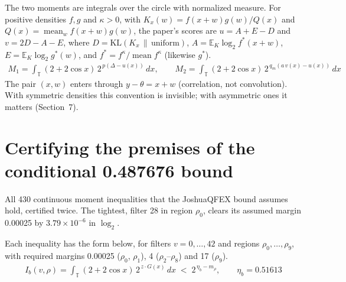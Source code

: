 \documentclass[11pt]{article}
\DeclareMathOperator{\mean}{mean}
\newcommand{\E}{\mathbb{E}}
\newcommand{\KL}{\mathrm{KL}}
\theoremstyle{plain}
\begin{document}
The two moments are integrals over the circle with normalized measure. For positive densities $f, g$ and $\kappa > 0$, with $K_x(w) = f(x+w)g(w)/Q(x)$ and $Q(x) = \mean_w f(x+w)g(w)$, the paper's scores are $u = A + E - D$ and $v = 2D - A - E$, where $D = \KL(K_x \,\|\, \mathrm{uniform})$, $A = \E_K \log_2 f^*(x+w)$, $E = \E_K \log_2 g^*(w)$, and $f^* = f^\kappa / \mean f^\kappa$ (likewise $g^*$).
\begin{gather*}
M_1 = \int_{\mathbb T} (2+2\cos x)\, 2^{\,p(\Delta - u(x))}\, dx, \qquad M_2 = \int_{\mathbb T} (2+2\cos x)\, 2^{\,q_m(a\, v(x) - u(x))}\, dx
\end{gather*}
The pair $(x, w)$ enters through $y - \theta = x + w$ (correlation, not convolution). With symmetric densities this convention is invisible; with asymmetric ones it matters (Section~7).

\section{Certifying the premises of the conditional 0.487676 bound}

All 430 continuous moment inequalities that the JoshuaQFEX bound assumes hold, certified twice. The tightest, filter 28 in region $\rho_0$, clears its assumed margin 0.00025 by $3.79\times10^{-6}$ in $\log_2$.

Each inequality has the form below, for filters $v = 0,\dots,42$ and regions $\rho_0,\dots,\rho_9$, with required margins 0.00025 ($\rho_0$, $\rho_1$), 4 ($\rho_2$--$\rho_8$) and 17 ($\rho_9$).
\begin{gather*}
I_b(v,\rho) = \int_{\mathbb T} (2+2\cos x)\, 2^{\,z\cdot G(x)}\, dx \;<\; 2^{\,\eta_b - m_\rho}, \qquad \eta_b = 0.51613
\end{gather*}
\end{document}
